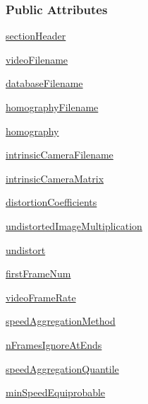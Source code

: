 \subsubsection*{Public Attributes}
\begin{DoxyCompactItemize}
\item 
\hyperlink{classstorage_1_1ProcessParameters_a8d06979c0292afa30e5b9a0cd7da1367}{section\-Header}
\item 
\hyperlink{classstorage_1_1ProcessParameters_a7d08be6d2b8023fe12aaf0f5fa1ee335}{video\-Filename}
\item 
\hyperlink{classstorage_1_1ProcessParameters_a4611b5effbff8949a3498861ba92d5d5}{database\-Filename}
\item 
\hyperlink{classstorage_1_1ProcessParameters_aed88a4aec4b3f18b05316952da6993e4}{homography\-Filename}
\item 
\hyperlink{classstorage_1_1ProcessParameters_a5c1647945769d794f0335e119d09ad1d}{homography}
\item 
\hyperlink{classstorage_1_1ProcessParameters_a3b9f0776b81d334f25d705bdb4c77e68}{intrinsic\-Camera\-Filename}
\item 
\hyperlink{classstorage_1_1ProcessParameters_a14422d1518a71a079c64938a59ff36d0}{intrinsic\-Camera\-Matrix}
\item 
\hyperlink{classstorage_1_1ProcessParameters_aa1a5dfd672fb3f66b7bcdc973350a580}{distortion\-Coefficients}
\item 
\hyperlink{classstorage_1_1ProcessParameters_add290dd3a09688dc0b2587f99f8c0d10}{undistorted\-Image\-Multiplication}
\item 
\hyperlink{classstorage_1_1ProcessParameters_a0b0facdf5f480b87c24a1b97381bdaad}{undistort}
\item 
\hyperlink{classstorage_1_1ProcessParameters_ac4393b9ae6e8b573ef292dc9ebadece7}{first\-Frame\-Num}
\item 
\hyperlink{classstorage_1_1ProcessParameters_ae3cd89ca34997fb567ff5c6ecebc855f}{video\-Frame\-Rate}
\item 
\hyperlink{classstorage_1_1ProcessParameters_a3a493868a73793b001c233770cc1e813}{speed\-Aggregation\-Method}
\item 
\hyperlink{classstorage_1_1ProcessParameters_a3cfd04661ca88760f29f88328bebab1c}{n\-Frames\-Ignore\-At\-Ends}
\item 
\hyperlink{classstorage_1_1ProcessParameters_a3a89cfa1826ee1b2758b01bb16ad9ea9}{speed\-Aggregation\-Quantile}
\item 
\hyperlink{classstorage_1_1ProcessParameters_a263ea38ba109d9b0684328c7d709e439}{min\-Speed\-Equiprobable}

\end{DoxyCompactItemize}
